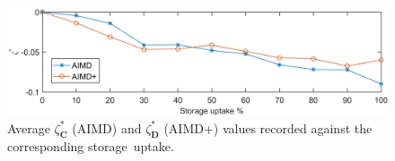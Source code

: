\begin{figure}[htb]\centering
 \includegraphics{_chapter1/fig/input/voltage-AIMD-compare}
 \caption{Average $\zeta_\textbf{C}^{*}$ (AIMD) and $\zeta_\textbf{D}^{*}$ (AIMD+) values recorded against the corresponding storage~uptake.}
 \label{ch1:fig:voltage-aimd-compare}
\end{figure}
